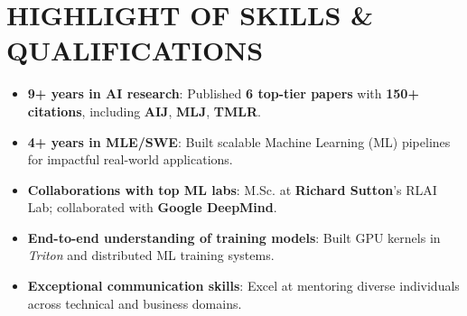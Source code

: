 \section{HIGHLIGHT OF SKILLS \& QUALIFICATIONS}
\begin{itemize}
    \item \textbf{9+ years in AI research}: Published \textbf{6 top-tier papers} with \textbf{150+ citations}, including \textbf{AIJ}, \textbf{MLJ}, \textbf{TMLR}.
    \item \textbf{4+ years in MLE/SWE}: Built scalable Machine Learning (ML) pipelines for impactful real-world applications.
    \item \textbf{Collaborations with top ML labs}: M.Sc. at \textbf{Richard Sutton}'s RLAI Lab; collaborated with \textbf{Google DeepMind}.
    \item \textbf{End-to-end understanding of training models}: Built GPU kernels in \textit{Triton} and distributed ML training systems.
    \item \textbf{Exceptional communication skills}: Excel at mentoring diverse individuals across technical and business domains.
\end{itemize}

